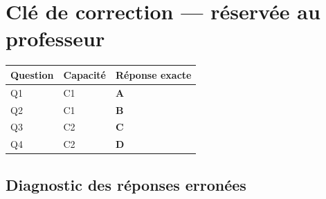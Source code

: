 \ifnxVersionProfesseur
\clearpage
\section*{Clé de correction — réservée au professeur}

\begin{center}
\begin{tabular}{lll}
\hline
Question & Capacité & Réponse exacte \\
\hline
Q1 & C1 & \textbf{A} \\
Q2 & C1 & \textbf{B} \\
Q3 & C2 & \textbf{C} \\
Q4 & C2 & \textbf{D} \\
\hline
\end{tabular}
\end{center}

\subsection*{Diagnostic des réponses erronées}

